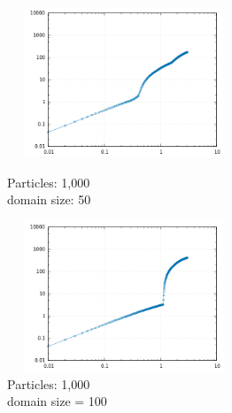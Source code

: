 \documentclass[a4paper,11pt]{article}
\begin{document}
\begin{figure}[!htb]
    \centering
    \begin{minipage}{.5\textwidth}
      \centering
      \includegraphics[width=7cm, height=4.5cm]{rms_n1000_l50.png}
      \caption{\small Particles: 1,000 \\ domain size: 50}
    \end{minipage}%
    \begin{minipage}{.5\textwidth}
      \centering
      \includegraphics[width=7cm, height=4.5cm]{rms_n1000_l100.png}
      \caption{\small Particles: 1,000 \\ domain size = 100}
    \end{minipage}
\end{figure}
\end{document}
